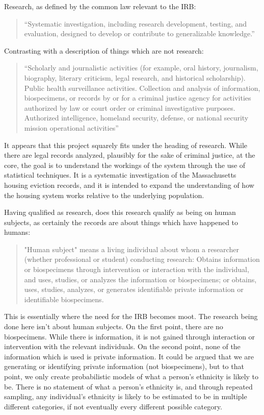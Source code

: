 Research, as defined by the common law relevant to the IRB:
\begin{quote}
“Systematic investigation, including research development, testing, and evaluation, designed to develop or contribute to generalizable knowledge.” ~\citep{WEBSITE:11}
\end{quote}
Contrasting with a description of things which are not research:
\begin{quote}
“Scholarly and journalistic activities (for example, oral history, journalism, biography, literary criticism, legal research, and historical scholarship).  Public health surveillance activities.  Collection and analysis of information, biospecimens, or records by or for a criminal justice agency for activities authorized by law or court order or criminal investigative purposes.  Authorized intelligence, homeland security, defense, or national security mission operational activities” ~\citep{WEBSITE:11}
\end{quote}
It appears that this project squarely fits under the heading of research.  While there are legal records analyzed, plausibly for the sake of criminal justice, at the core, the goal is to understand the workings of the system through the use of statistical techniques.  It is a systematic investigation of the Massachusetts housing eviction records, and it is intended to expand the understanding of how the housing system works relative to the underlying population. \par
Having qualified as research, does this research qualify as being on human subjects, as certainly the records are about things which have happened to humans:
\begin{quote}
"Human subject" means a living individual about whom a researcher (whether professional or student) conducting research: Obtains information or biospecimens through intervention or interaction with the individual, and uses, studies, or analyzes the information or biospecimens; or obtains, uses, studies, analyzes, or generates identifiable private information or identifiable biospecimens. ~\citep{WEBSITE:9}
\end{quote}
\par
This is essentially where the need for the IRB becomes moot.  The research being done here isn’t about human subjects.  On the first point, there are no biospecimens.  While there is information, it is not gained through interaction or intervention with the relevant individuals.  On the second point, none of the information which is used is private information.  It could be argued that we are generating or identifying private information (not biospecimens), but to that point, we only create probabilistic models of what a person’s ethnicity is likely to be.  There is no statement of what a person’s ethnicity is, and through repeated sampling, any individual's ethnicity is likely to be estimated to be in multiple different categories, if not eventually every different possible category. \par

